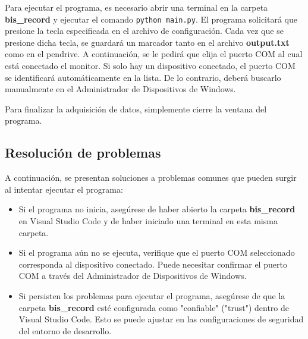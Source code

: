 \documentclass{article}
\begin{document}
Para ejecutar el programa, es necesario abrir una terminal en la carpeta \textbf{bis\_record} y ejecutar el comando \texttt{python main.py}. El programa solicitará que presione la tecla especificada en el archivo de configuración. Cada vez que se presione dicha tecla, se guardará un marcador tanto en el archivo \textbf{output.txt} como en el pendrive. A continuación, se le pedirá que elija el puerto COM al cual está conectado el monitor. Si solo hay un dispositivo conectado, el puerto COM se identificará automáticamente en la lista. De lo contrario, deberá buscarlo manualmente en el Administrador de Dispositivos de Windows.

Para finalizar la adquisición de datos, simplemente cierre la ventana del programa.


\subsection{Resolución de problemas}

A continuación, se presentan soluciones a problemas comunes que pueden surgir al intentar ejecutar el programa:

\begin{itemize}
	\item Si el programa no inicia, asegúrese de haber abierto la carpeta \textbf{bis\_record} en Visual Studio Code y de haber iniciado una terminal en esta misma carpeta.
	\item Si el programa aún no se ejecuta, verifique que el puerto COM seleccionado corresponda al dispositivo conectado. Puede necesitar confirmar el puerto COM a través del Administrador de Dispositivos de Windows.
	\item Si persisten los problemas para ejecutar el programa, asegúrese de que la carpeta \textbf{bis\_record} esté configurada como "confiable" ("trust") dentro de Visual Studio Code. Esto se puede ajustar en las configuraciones de seguridad del entorno de desarrollo.
\end{itemize}
\end{document}
